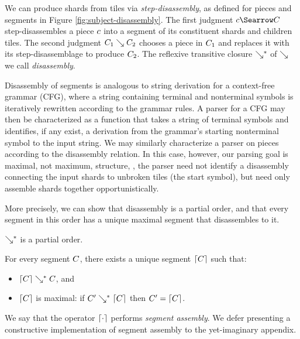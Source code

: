 





We can produce shards from tiles via \emph{step-disassembly},
as defined for pieces and segments in Figure \ref{fig:subject-disassembly}.
The first judgment $\pieceDisassembles{\selem}{\selection}$
step-disassembles a piece $c$ into a segment of
its constituent shards and children tiles.
The second judgment $C_1 \searrow C_2$
chooses a piece in $C_1$ and replaces it with its
step-disassemblage to produce $C_2$.
The reflexive transitive closure $\searrow^*$ of
$\searrow$ we call \emph{disassembly}.



Disassembly of segments is analogous to string derivation for a
context-free grammar (CFG),
where a string containing terminal and nonterminal symbols is iteratively
rewritten according to the grammar rules.
A parser for a CFG may then be characterized as a function
that takes a string of terminal symbols and identifies,
if any exist,
a derivation from the grammar's starting nonterminal
symbol to the input string.
We may similarly characterize a parser on pieces according
to the disassembly relation.
In this case, however, our parsing goal is maximal,
not maximum, structure, \ie, the parser
need not identify a disassembly connecting the input
shards to unbroken tiles (the start symbol), but need only assemble shards
together opportunistically.

More precisely, we can show that disassembly is a
partial order, and that every segment in this order
has a unique maximal segment that disassembles to it.
\begin{lemma}
  $\searrow^*$ is a partial order.
\end{lemma}
\begin{lemma}\label{lemma:unique-parsed-selection}
  For every segment $C$, there exists a unique
  segment $\left\lceil C\right\rceil$ such that:
  \begin{itemize}
  \item $\left\lceil C\right\rceil\searrow^*C$, and
  \item $\left\lceil C\right\rceil$ is maximal: if $C'\searrow^*\left\lceil C\right\rceil$ then $C' = \left\lceil C\right\rceil$.
  \end{itemize}
\end{lemma}
\noindent
We say that the operator $\left\lceil\cdot\right\rceil$ performs \emph{segment assembly}.
We defer presenting a constructive implementation of segment
assembly to the yet-imaginary appendix.

